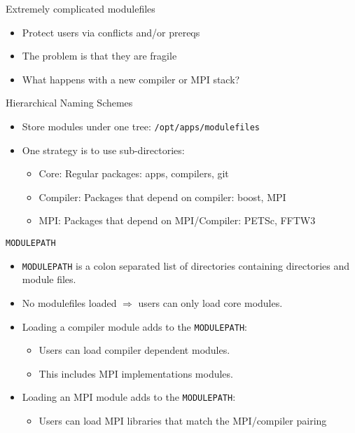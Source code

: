 \documentclass{beamer}
\begin{document}
\begin{frame}{Extremely complicated modulefiles}
  \begin{itemize}
    \item Protect users via conflicts and/or prereqs
    \item The problem is that they are fragile
    \item What happens with a new compiler or MPI stack?
  \end{itemize}
\end{frame}

\begin{frame}{Hierarchical Naming Schemes}
  \begin{itemize}
    \item Store modules under one tree: \texttt{/opt/apps/modulefiles}
    \item One strategy is to use sub-directories:
      \begin{itemize}
        \item Core: Regular packages: apps, compilers, git
        \item Compiler: Packages that depend on compiler: boost, MPI
        \item MPI: Packages that depend on MPI/Compiler: PETSc, FFTW3
      \end{itemize}
  \end{itemize}
\end{frame}

\begin{frame}{\texttt{MODULEPATH}}
  \begin{itemize}
    \item \texttt{MODULEPATH} is a colon separated list of directories
      containing directories and module files.
    \item No modulefiles loaded $\Rightarrow$ users can only load core modules.
    \item Loading a compiler module adds to the \texttt{MODULEPATH}:
      \begin{itemize}
        \item Users can load compiler dependent modules.
        \item This includes MPI implementations modules.
      \end{itemize}
    \item Loading an MPI module adds to the \texttt{MODULEPATH}:
      \begin{itemize}
        \item Users can load MPI libraries that match the MPI/compiler pairing
      \end{itemize}
  \end{itemize}
\end{frame}
\end{document}
